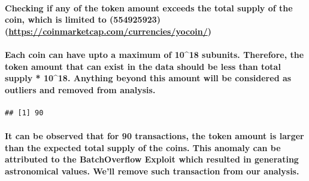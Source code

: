 \documentclass[]{article}
\newenvironment{Shaded}{\begin{snugshade}}{\end{snugshade}}
\newcommand{\KeywordTok}[1]{\textcolor[rgb]{0.13,0.29,0.53}{\textbf{#1}}}
\newcommand{\DecValTok}[1]{\textcolor[rgb]{0.00,0.00,0.81}{#1}}
\newcommand{\StringTok}[1]{\textcolor[rgb]{0.31,0.60,0.02}{#1}}
\newcommand{\OperatorTok}[1]{\textcolor[rgb]{0.81,0.36,0.00}{\textbf{#1}}}
\newcommand{\NormalTok}[1]{#1}
\let\oldparagraph\paragraph
\renewcommand{\paragraph}[1]{\oldparagraph{#1}\mbox{}}
\begin{document}
\paragraph{\texorpdfstring{Checking if any of the token amount exceeds
the total supply of the coin, which is limited to (554925923)
(\url{https://coinmarketcap.com/currencies/yocoin/})}{Checking if any of the token amount exceeds the total supply of the coin, which is limited to (554925923) (https://coinmarketcap.com/currencies/yocoin/)}}\label{checking-if-any-of-the-token-amount-exceeds-the-total-supply-of-the-coin-which-is-limited-to-554925923-httpscoinmarketcap.comcurrenciesyocoin}

\paragraph{Each coin can have upto a maximum of 10\^{}18 subunits.
Therefore, the token amount that can exist in the data should be less
than total supply * 10\^{}18. Anything beyond this amount will be
considered as outliers and removed from
analysis.}\label{each-coin-can-have-upto-a-maximum-of-1018-subunits.-therefore-the-token-amount-that-can-exist-in-the-data-should-be-less-than-total-supply-1018.-anything-beyond-this-amount-will-be-considered-as-outliers-and-removed-from-analysis.-1}

\begin{Shaded}
\end{Shaded}

\begin{verbatim}
## [1] 90
\end{verbatim}

\paragraph{It can be observed that for 90 transactions, the token amount
is larger than the expected total supply of the coins. This anomaly can
be attributed to the BatchOverflow Exploit which resulted in generating
astronomical values. We'll remove such transaction from our
analysis.}\label{it-can-be-observed-that-for-90-transactions-the-token-amount-is-larger-than-the-expected-total-supply-of-the-coins.-this-anomaly-can-be-attributed-to-the-batchoverflow-exploit-which-resulted-in-generating-astronomical-values.-well-remove-such-transaction-from-our-analysis.}
\end{document}
